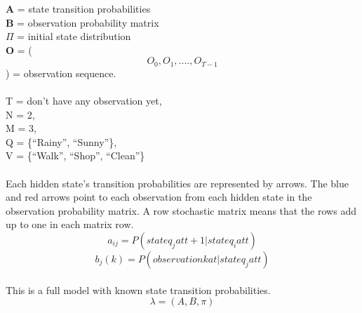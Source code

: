 \documentclass[12pt,letterpaper]{article}
\begin{document}
\textbf{A} = state transition probabilities
\\
\textbf{B} = observation probability matrix
\\
\textbf{$\Pi$} = initial state distribution
\\
\textbf{O} = ( \[O_0, O_1, ...., O_{T - 1}\] ) = observation sequence.
\\
\\
T = don’t have any observation yet,
\\
N = 2,
\\
M = 3,
\\
Q = \{``Rainy”, ``Sunny”\},
\\
V = \{``Walk”, ``Shop”, ``Clean”\}
\\
\\
Each hidden state's transition probabilities are represented by arrows. The blue and red arrows point to each observation from each hidden state in the observation probability matrix. A row stochastic matrix means that the rows add up to one in each matrix row.
\[ a_{ij} = P(state q_j at t + 1 |  state q_i at t) \]
\[ b_j(k) = P(observation k at | state q_j at t) \]
\\ 
This is a full model with known state transition probabilities.
\\ 
\[\lambda = (A, B, \pi) \]
\end{document}
